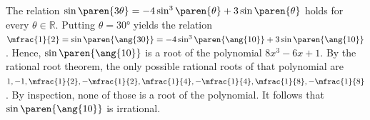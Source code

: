 The relation
$\sin\paren{3 \theta} = - 4 \sin^3\paren{\theta} + 3 \sin\paren{\theta}$
holds for every $\theta \in \mathbb{R}$.
Putting $\theta = \ang{30}$ yields the relation
$\mfrac{1}{2} = \sin\paren{\ang{30}}
 = - 4 \sin^3\paren{\ang{10}} + 3 \sin\paren{\ang{10}}$.
Hence, $\sin\paren{\ang{10}}$ is a root of the polynomial $8 x^3 - 6 x + 1$.
By the rational root theorem, the only possible rational roots of that polynomial are
$1, -1, \mfrac{1}{2}, - \mfrac{1}{2}, \mfrac{1}{4}, - \mfrac{1}{4}, \mfrac{1}{8}, - \mfrac{1}{8}$.
By inspection, none of those is a root of the polynomial.
It follows that $\sin\paren{\ang{10}}$ is irrational.

